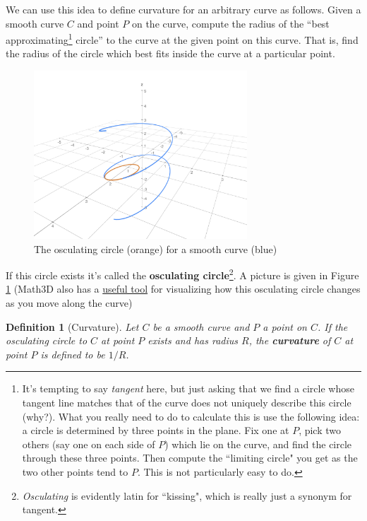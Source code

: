 \documentclass[12pt]{article}
\numberwithin{equation}{subsection}
\numberwithin{figure}{subsection}
\newtheorem{defn}[subsection]{Definition}
\theoremstyle{note}
\begin{document}
{We can use this idea to define curvature for an arbitrary curve as follows. Given a smooth curve $C$ and point $P$ on the curve, compute the radius of the ``best approximating\footnote{It's tempting to say  \textit{tangent} here, but just asking that we find a circle whose tangent line matches that of the curve does not uniquely describe this circle (why?). What you really need to do to calculate this is use the following idea: a circle is determined by three points in the plane. Fix one at $P$, pick two others (say one on each side of $P$) which lie on the curve, and find the circle through these three points. Then compute the ``limiting circle" you get as the two other points tend to $P$. This is not particularly easy to do.} circle'' to the curve at the given point on this curve. That is, find the radius of the circle which best fits inside the curve at a particular point. 

\begin{figure}[h!]
\centering
\includegraphics[width=80mm]{Images/curvature-pic}
\caption{The osculating circle (orange) for a smooth curve (blue)}
\label{fig-osc-circle}
\end{figure}

If this circle exists it's called the \textbf{osculating circle}\footnote{\textit{Osculating} is evidently latin for ``kissing", which is really just a synonym for tangent.}. A picture is given in Figure \ref{fig-osc-circle} (Math3D also has a \href{https://www.math3d.org/osculating_circle}{useful tool} for visualizing how this osculating circle changes as you move along the curve)



\begin{defn}[Curvature] Let $C$ be a smooth curve and $P$ a point on $C$. If the osculating circle to $C$ at point $P$ exists and has radius $R$, the \textbf{curvature} of $C$ at point $P$ is defined to be $1/R$.
\end{defn} 

}
\end{document}
